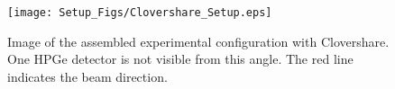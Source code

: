 \begin{figure}
    \centering
    \texttt{[image: Setup\_Figs/Clovershare\_Setup.eps]}
    \caption{Image of the assembled experimental configuration with Clovershare. One HPGe detector is not visible from this angle. The red line indicates the beam direction.}
    \label{fig:clovershare_config}
\end{figure}